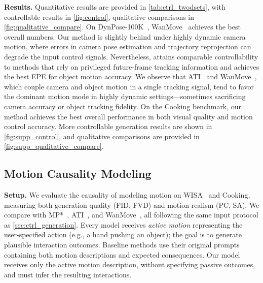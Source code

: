 \noindent\textbf{Results.}
Quantitative results are provided in \cref{tab:ctrl_twodsets}, with  controllable results in \cref{fig:control}, qualitative comparisons in \cref{fig:qualitative_compare}.
On DynPose-100K~\cite{rockwell2025dynamic}, WanMove~\cite{chu2025wanmove} achieves the best overall numbers.
Our method is slightly behind under highly dynamic camera motion, where errors in camera pose estimation and trajectory reprojection can degrade the input control signals.
Nevertheless, \ours attains comparable controllability to methods that rely on privileged future-frame tracking information and achieves the best EPE for object motion accuracy.
We observe that ATI~\cite{wang2025ati} and WanMove~\cite{chu2025wanmove}, which couple camera and object motion in a single tracking signal, tend to favor the dominant motion mode in highly dynamic settings---sometimes sacrificing camera accuracy or object tracking fidelity.
On the Cooking benchmark, our method achieves the best overall performance in both visual quality and motion control accuracy. More controllable generation results are shown in \cref{fig:supp_control}, and qualitative comparisons are provided in \cref{fig:supp_qualitative_compare}.


\subsection{Motion Causality Modeling}
\label{sec:exp_casual}

\noindent\textbf{Setup.}
We evaluate the causality of modeling motion on WISA~\cite{wang2025wisa} and Cooking, measuring both generation quality (FID, FVD) and motion realism (PC, SA).
We compare with MP*~\cite{geng2024motionprompting}, ATI~\cite{wang2025ati}, and WanMove~\cite{chu2025wanmove}, all following the same input protocol as \cref{sec:ctrl_generation}.
Every model receives \emph{active motion} representing the user-specified action (e.g., a hand pushing an object); the goal is to generate plausible interaction outcomes.
Baseline methods use their original prompts containing both motion descriptions and expected consequences.
Our model receives only the active motion description, without specifying passive outcomes, and must infer the resulting interactions.

